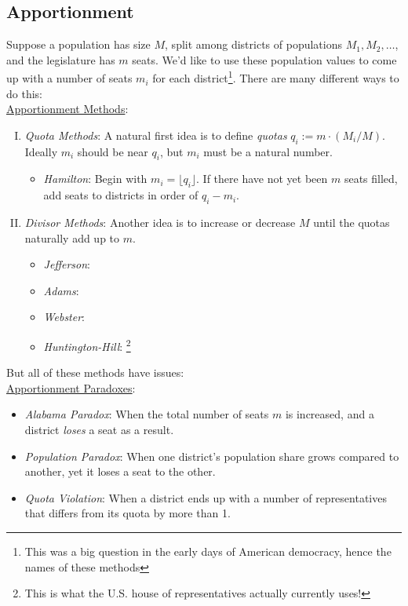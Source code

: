 \documentclass{amsart}
\begin{document}
\subsection{Apportionment} Suppose a population has size $M$, split among districts of populations $M_1,M_2,\dots$, and the legislature has $m$ seats. We'd like to use these population values to come up with a number of seats $m_i$ for each district\footnote{This was a big question in the early days of American democracy, hence the names of these methods}. There are many different ways to do this:\\

\underline{Apportionment Methods}:
\begin{enumerate}[(I)]
	\item \textit{Quota Methods}: A natural first idea is to define \textit{quotas} $q_i := m\cdot (M_i/M)$. Ideally $m_i$ should be near $q_i$, but $m_i$ must be a natural number.
		\begin{itemize}
			\item \textit{Hamilton}: Begin with $m_i = \lfloor q_i \rfloor$. If there have not yet been $m$ seats filled, add seats to districts in order of $q_i-m_i$.
		\end{itemize}
	\item \textit{Divisor Methods}: Another idea is to increase or decrease $M$ until the quotas naturally add up to $m$.
	\begin{itemize}
		\item \textit{Jefferson}: 
		\item \textit{Adams}:
		\item \textit{Webster}:
		\item \textit{Huntington-Hill}: \footnote{This is what the U.S. house of representatives actually currently uses!}\\
	\end{itemize}
\end{enumerate}

But all of these methods have issues:\\

\underline{Apportionment Paradoxes}:
\begin{itemize}
	\item \textit{Alabama Paradox}: When the total number of seats $m$ is increased, and a district \textit{loses} a seat as a result.
	\item \textit{Population Paradox}: When one district's population share grows compared to another, yet it loses a seat to the other.
	\item \textit{Quota Violation}: When a district ends up with a number of representatives that differs from its quota by more than 1.\\
\end{itemize}
\end{document}

